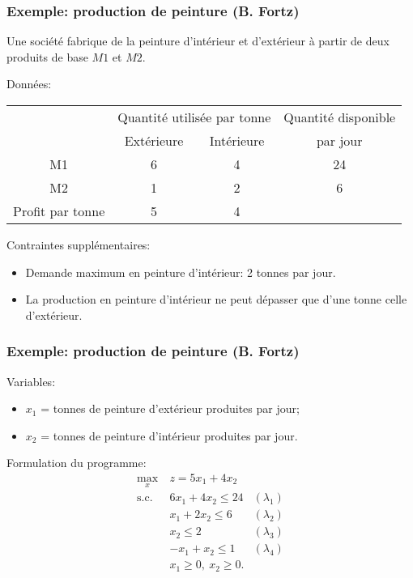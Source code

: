 \documentclass[usepdftitle=false]{beamer}
\begin{document}
\begin{frame}
\frametitle{Exemple: production de peinture (B. Fortz)}

Une société fabrique de la peinture d'intérieur et d'extérieur à partir de deux
produits de base $M1$ et $M2$.

\mbox{}

Données:
\begin{tabular}{cccc}
& \multicolumn{2}{c}{Quantité utilisée par tonne}
& Quantité disponible \\
& Extérieure & Intérieure &  par jour \\
\hline
M1 & 6 & 4 & 24 \\
M2 & 1 & 2 & 6 \\
\hline
Profit par tonne & 5 & 4
\end{tabular}

\mbox{}

Contraintes supplémentaires:
\begin{itemize}
\item
Demande maximum en peinture d’intérieur: 2 tonnes par jour.
\item
La production en peinture d'intérieur ne peut dépasser que d’une tonne celle d'extérieur.
\end{itemize}

\end{frame}

\begin{frame}
\frametitle{Exemple: production de peinture (B. Fortz)}

Variables:
\begin{itemize}
\item
$x_1$ = tonnes de peinture d’extérieur produites par jour;
\item
$x_2$ = tonnes de peinture d’intérieur produites par jour.
\end{itemize}

\mbox{}

Formulation du programme:
\begin{align*}
\max_x \ & z = 5x_1 + 4x_2 \\
\mbox{s.c. } & 6x_1 + 4x_2 \leq 24 & (\lambda_1) \\
& x_1 + 2x_2 \leq 6 & (\lambda_2) \\
& x_2 \leq 2 & (\lambda_3) \\
& -x_1 + x_2 \leq 1 & (\lambda_4) \\
& x_1 \geq 0,\ x_2 \geq 0.
\end{align*}

\end{frame}
\end{document}
